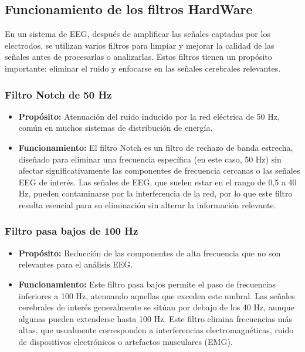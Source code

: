 \documentclass{article}
\begin{document}
\subsection{Funcionamiento de los filtros HardWare}

En un sistema de EEG, después de amplificar las señales captadas por los electrodos, se utilizan varios filtros para limpiar y mejorar la calidad de las señales antes de procesarlas o analizarlas. Estos filtros tienen un propósito importante: eliminar el ruido y enfocarse en las señales cerebrales relevantes. 

\subsubsection{Filtro Notch de 50 Hz}
\begin{itemize}
    \item \textbf{Propósito:} Atenuación del ruido inducido por la red eléctrica de 50 Hz, común en muchos sistemas de distribución de energía.
    \item \textbf{Funcionamiento:} El filtro Notch es un filtro de rechazo de banda estrecha, diseñado para eliminar una frecuencia específica (en este caso, 50 Hz) sin afectar significativamente las componentes de frecuencia cercanas o las señales EEG de interés. Las señales de EEG, que suelen estar en el rango de 0,5 a 40 Hz, pueden contaminarse por la interferencia de la red, por lo que este filtro resulta esencial para su eliminación sin alterar la información relevante.
\end{itemize}
\subsubsection{Filtro pasa bajos de 100 Hz}
\begin{itemize}
    \item \textbf{Propósito:} Reducción de las componentes de alta frecuencia que no son relevantes para el análisis EEG.
    \item \textbf{Funcionamiento:} Este filtro pasa bajos permite el paso de frecuencias inferiores a 100 Hz, atenuando aquellas que exceden este umbral. Las señales cerebrales de interés generalmente se sitúan por debajo de los 40 Hz, aunque algunas pueden extenderse hasta 100 Hz. Este filtro elimina frecuencias más altas, que usualmente corresponden a interferencias electromagnéticas, ruido de dispositivos electrónicos o artefactos musculares (EMG).
\end{itemize}
\end{document}
